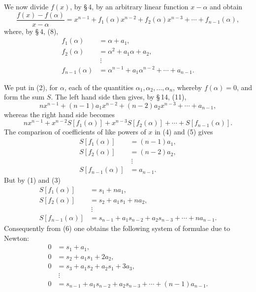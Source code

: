 \documentclass[11pt]{article}
\begin{document}
We now divide $f(x)$, by \S\,4, by an arbitrary linear function $x-\alpha$ and obtain
\begin{equation}
 \frac{f(x)-f(\alpha)}{x-\alpha}
   =x^{n-1}+f_1(\alpha)x^{n-2}+f_2(\alpha)x^{n-3}+\cdots+f_{n-1}(\alpha),
\tag{2}
\end{equation}
where, by \S\,4, (8),
\begin{equation}
\begin{aligned}
 f_1(\alpha)&=\alpha+a_1,\\
 f_2(\alpha)&=\alpha^2+a_1\alpha+a_2,\\
 &\ \vdots\\
 f_{n-1}(\alpha)&=\alpha^{n-1}+a_1\alpha^{n-2}+\cdots+a_{n-1}.
\end{aligned}
\tag{3}
\end{equation}

We put in (2), for $\alpha$, each of the quantities $\alpha_1,\alpha_2,\ldots,\alpha_n$, whereby $f(\alpha)=0$, and form the sum $S$. The left hand side then gives, by \S\,14, (11),
\begin{equation}
 n x^{n-1}+(n-1)a_1x^{n-2}+(n-2)a_2x^{n-3}+\cdots+a_{n-1},
\tag{4}
\end{equation}
whereas the right hand side becomes
\begin{equation}
 n x^{n-1}+x^{n-2}S[f_1(\alpha)]+x^{n-3}S[f_2(\alpha)]+\cdots+S[f_{n-1}(\alpha)].
\tag{5}
\end{equation}
The comparison of coefficients of like powers of $x$ in (4) and (5) gives
\begin{equation}
\begin{aligned}
 S[f_1(\alpha)]&=(n-1)a_1,\\
 S[f_2(\alpha)]&=(n-2)a_2,\\
 &\ \vdots\\
 S[f_{n-1}(\alpha)]&=a_{n-1}.
\end{aligned}
\tag{6}
\end{equation}
But by (1) and (3)
\[
\begin{aligned}
 S[f_1(\alpha)]&=s_1+na_1,\\
 S[f_2(\alpha)]&=s_2+a_1s_1+na_2,\\
 &\ \vdots\\
 S[f_{n-1}(\alpha)]&=s_{n-1}+a_1s_{n-2}+a_2s_{n-3}+\cdots+na_{n-1}.
\end{aligned}
\]
Consequently from (6) one obtains the following system of formulae due to Newton:
\begin{equation}
\begin{aligned}
0&=s_1+a_1,\\
0&=s_2+a_1s_1+2a_2,\\
0&=s_3+a_1s_2+a_2s_1+3a_3,\\
&\ \vdots\\
0&=s_{n-1}+a_1s_{n-2}+a_2s_{n-3}+\cdots+(n-1)a_{n-1}.
\end{aligned}
\tag{7}
\end{equation}
\end{document}
